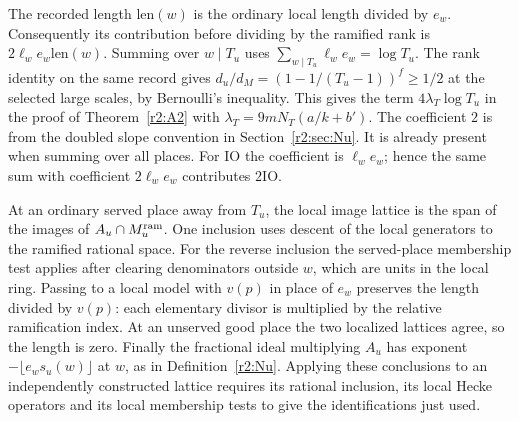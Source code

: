 The recorded length $\mathrm{len}(w)$ is the ordinary local length
divided by $e_w$. Consequently its contribution before dividing by the
ramified rank is $2\ell_we_w\mathrm{len}(w)$. Summing over $w\mid T_u$
uses $\sum_{w\mid T_u}\ell_we_w=\log T_u$. The rank identity on the
same record gives $d_u/d_M=(1-1/(T_u-1))^f\ge 1/2$ at the selected
large scales, by Bernoulli's inequality. This gives the term
$4\lambda_T\log T_u$ in the proof of Theorem~\ref{r2:A2}
with $\lambda_T=9mN_T(a/k+b')$.
The coefficient $2$ is from the doubled slope convention in
Section~\ref{r2:sec:Nu}. It is already present when summing over
all places. For $\mathrm{IO}$ the coefficient is $\ell_we_w$; hence
the same sum with coefficient $2\ell_we_w$ contributes $2\mathrm{IO}$.

At an ordinary served place away from $T_u$, the local image lattice
is the span of the images of $A_u\cap M^{\rm ram}_u$. One inclusion
uses descent of the local generators to the ramified rational space.
For the reverse inclusion the served-place membership test applies
after clearing denominators outside $w$, which are units in the local
ring. Passing to a local model with $v(p)$ in place of $e_w$ preserves
the length divided by $v(p)$: each elementary divisor is multiplied
by the relative ramification index. At an unserved good place the
two localized lattices agree, so the length is zero. Finally the
fractional ideal multiplying $A_u$ has exponent
$-\lfloor e_ws_u(w)\rfloor$ at $w$, as in Definition~\ref{r2:Nu}.
Applying these conclusions to an independently constructed lattice
requires its rational inclusion, its local Hecke operators and its
local membership tests to give the identifications just used.

